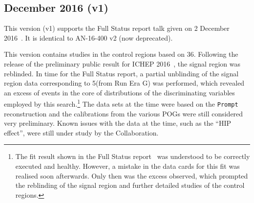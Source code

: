 \subsection{December 2016 (v1)}

This version (v1) supports the Full Status report talk given on
2 December 2016~\cite{fullstatus}. It is identical to
AN-16-400 v2 (now deprecated).

This version contains studies in the control regions based on
36\fbinv. Following the release of the preliminary public result for
ICHEP 2016~\cite{CMS-PAS-SUS-16-016}, the signal region was
reblinded. In time for the Full Status report, a partial unblinding of
the signal region data corresponding to 5\fbinv (from Run Era G) was
performed, which revealed an excess of events in the core of
distributions of the discriminating variables employed by this
search.\footnote{The fit result shown in the Full Status
  report~\cite{fullstatus} was understood to be correctly executed and
  healthy. However, a mistake in the data cards for this fit was
  realised soon afterwards. Only then was the excess observed, which
  prompted the reblinding of the signal region and further detailed
  studies of the control regions.}  The data sets at the time were
based on the \verb!Prompt!  reconstruction and the calibrations from
the various POGs were still considered very preliminary. Known issues
with the data at the time, such as the ``HIP effect'', were still
under study by the Collaboration.

